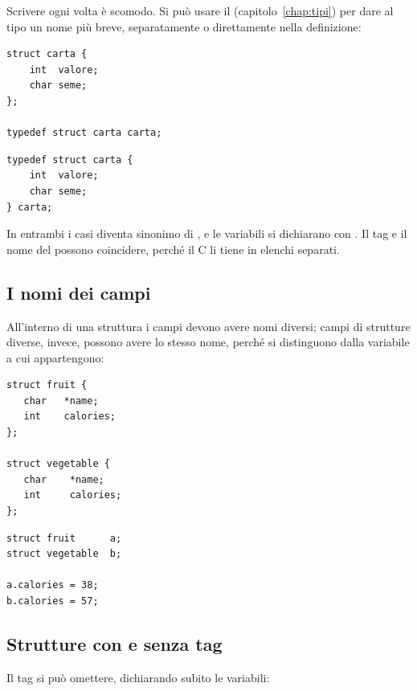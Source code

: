 Scrivere ogni volta  è scomodo. Si può usare il
 (capitolo~\ref{chap:tipi}) per dare al tipo un nome più
breve, separatamente o direttamente nella definizione:

\begin{affianco}[0.5][c]
\begin{lstlisting}[style=c]
struct carta {
    int  valore;
    char seme;
};

typedef struct carta carta;
\end{lstlisting}
\risultato
\begin{lstlisting}[style=c]
typedef struct carta {
    int  valore;
    char seme;
} carta;
\end{lstlisting}
\end{affianco}

In entrambi i casi  diventa sinonimo di , e le
variabili si dichiarano con . Il tag e il nome del
 possono coincidere, perché il C li tiene in elenchi separati.

\subsection{I nomi dei campi}

All'interno di una struttura i campi devono avere nomi diversi; campi di
strutture diverse, invece, possono avere lo stesso nome, perché si
distinguono dalla variabile a cui appartengono:

\begin{affianco}[0.5][c]
\begin{lstlisting}[style=c]
struct fruit {
   char   *name;
   int    calories;
};

struct vegetable {
   char    *name;
   int     calories;
};
\end{lstlisting}
\risultato
\begin{lstlisting}[style=c]
struct fruit      a;
struct vegetable  b;

a.calories = 38;
b.calories = 57;
\end{lstlisting}
\end{affianco}

\subsection{Strutture con e senza tag}

Il tag si può omettere, dichiarando subito le variabili:

